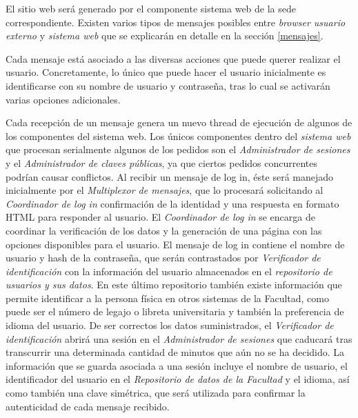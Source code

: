 El sitio web será generado por el componente sistema web de la sede correspondiente. Existen varios tipos de mensajes posibles entre \emph{browser usuario externo} y \emph{sistema web} que se explicarán en detalle en la sección \ref{mensajes}. 

Cada mensaje está asociado a las diversas acciones que puede querer realizar el usuario. Concretamente, lo único que puede hacer el usuario inicialmente es identificarse con su nombre de usuario y contraseña, tras lo cual se activarán varias opciones adicionales.


Cada recepción de un mensaje genera un nuevo thread de ejecución de algunos de los componentes del sistema web. Los únicos componentes dentro del \emph{sistema web} que procesan serialmente algunos de los pedidos son el  \emph{Administrador de sesiones} y el \emph{Administrador de claves públicas}, ya que ciertos pedidos concurrentes podrían causar conflictos.
Al recibir un mensaje de log in, éste será manejado inicialmente por el \emph{Multiplexor de mensajes}, que lo procesará solicitando al \emph{Coordinador de log in} confirmación de la identidad y una respuesta en formato HTML para responder al usuario. El \emph{Coordinador de log in} se encarga de coordinar la verificación de los datos y la generación de una página con las opciones disponibles para el usuario. 
El mensaje de log in contiene el nombre de usuario y hash de la contraseña, que serán contrastados por \emph{Verificador de identificación} con la información del usuario almacenados en el \emph{repositorio de usuarios y sus datos}. En este último repositorio también existe información que permite identificar a la persona física en otros sistemas de la Facultad, como puede ser el número de legajo o libreta universitaria y también la preferencia de idioma del usuario. 
De ser correctos los datos suministrados, el \emph{Verificador de identificación} abrirá una sesión en el \emph{Administrador de sesiones} que caducará tras transcurrir una determinada cantidad de minutos que aún no se ha decidido.
La información que se guarda asociada a una sesión incluye el nombre de usuario, el identificador del usuario en el \emph{Repositorio de datos de la Facultad} y el idioma, así como también una clave simétrica, que será utilizada para confirmar la autenticidad de cada mensaje recibido.  
